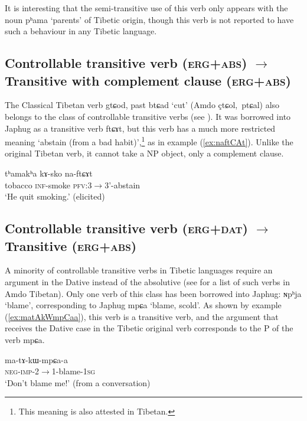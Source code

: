 \documentclass[oldfontcommands,oneside,a4paper,11pt]{article}
\newcommand{\ipa}[1]{{\phon \mbox{#1}}} %
\newcommand{\refb}[1]{(\ref{#1})}
\begin{document}
It is interesting that the semi-transitive use of this verb only appears with the noun \ipa{pʰama} `parents' of Tibetic origin, though this verb is not reported to have such a behaviour in any Tibetic language.



\subsection{Controllable transitive verb (\textsc{erg+abs})  $\rightarrow$ Transitive with complement clause (\textsc{erg+abs})}
The Classical Tibetan verb \ipa{gtɕod}, past \ipa{btɕad} `cut' (Amdo \ipa{çtɕol, ptɕal}) also belongs to the class of controllable transitive verbs (see \citealt[86, ex. 187]{haller04themchen}). It was borrowed into Japhug as a transitive verb \ipa{ftɕɤt}, but this verb has a much more restricted meaning `abstain (from a bad habit)',\footnote{This meaning is also attested in Tibetan.} as in example \refb{ex:naftCAt}. Unlike the original Tibetan verb, it cannot take a NP object, only a complement clause.

\begin{exe}
\ex \label{ex:naftCAt}
\gll
\ipa{tʰamakʰa} \ipa{kɤ-sko} \ipa{na-ftɕɤt}\\
tobacco \textsc{inf}-smoke \textsc{pfv}:3$\rightarrow$3'-abstain \\
\glt `He quit smoking.' (elicited)
\end{exe}

\subsection{Controllable transitive verb (\textsc{erg+dat})  $\rightarrow$ Transitive (\textsc{erg+abs}) }
A minority of controllable transitive verbs in Tibetic languages require an argument in the Dative instead of the absolutive (see \citealt[111]{haller04themchen} for a list of such verbs in Amdo Tibetan). Only one verb of this class has been borrowed into Japhug: \ipa{ɴpʰja} `blame', corresponding to Japhug \ipa{mpɕa} `blame, scold'. As shown by example \refb{ex:matAkWmpCaa}, this verb is a transitive verb, and the argument that receives the Dative case in the Tibetic original verb corresponds to the P of the verb \ipa{mpɕa}.

\begin{exe}
\ex \label{ex:matAkWmpCaa}
\gll
  \ipa{ma-tɤ-kɯ-mpɕa-a} \\
  \textsc{neg-imp}-2$\rightarrow$1-blame-\textsc{1sg} \\
\glt `Don't blame me!' (from a conversation)
\end{exe}
  
\end{document}
